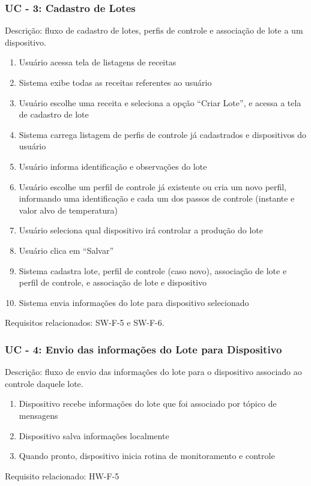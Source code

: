 \subsubsection*{UC - 3: Cadastro de Lotes}
Descrição: fluxo de cadastro de lotes, perfis de controle e associação de lote a um dispositivo.
\begin{enumerate}
    \item Usuário acessa tela de listagens de receitas
    \item Sistema exibe todas as receitas referentes ao usuário
    \item Usuário escolhe uma receita e seleciona a opção “Criar Lote”, e acessa a tela de cadastro de lote
    \item Sistema carrega listagem de perfis de controle já cadastrados e dispositivos do usuário
    \item Usuário informa identificação e observações do lote
    \item Usuário escolhe um perfil de controle já existente ou cria um novo perfil, informando uma identificação e cada um dos passos de controle (instante e valor alvo de temperatura)
    \item Usuário seleciona qual dispositivo irá controlar a produção do lote
    \item Usuário clica em “Salvar”
    \item Sistema cadastra lote, perfil de controle (caso novo), associação de lote e perfil de controle, e associação de lote e dispositivo
    \item Sistema envia informações do lote para dispositivo selecionado
\end{enumerate}
Requisitos relacionados: SW-F-5 e SW-F-6.

\subsubsection*{UC - 4: Envio das informações do Lote para Dispositivo}
Descrição: fluxo de envio das informações do lote para o dispositivo associado ao controle daquele lote.
\begin{enumerate}
    \item Dispositivo recebe informações do lote que foi associado por tópico de mensagens
    \item Dispositivo salva informações localmente
    \item Quando pronto, dispositivo inicia rotina de monitoramento e controle
\end{enumerate}    
Requisito relacionado: HW-F-5

